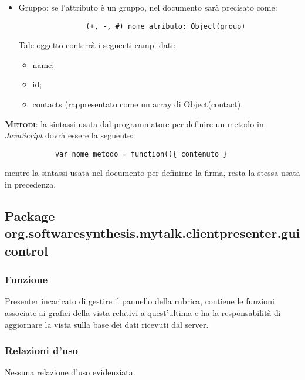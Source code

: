 \begin{description}
\begin{itemize}
\item Gruppo: se l'attributo è un gruppo, nel documento sarà precisato come:
			
			\begin{verbatim}
				(+, -, #) nome_atributo: Object(group)
			\end{verbatim}
			Tale oggetto conterrà i seguenti campi dati:
			\begin{itemize}
			\item name;
			\item id;
			\item contacts (rappresentato come un array di Object(contact).
			\end{itemize}
		\end{itemize}
	\item{\scshape\bfseries Metodi}: la sintassi usata dal programmatore per definire un metodo in \textit{JavaScript} dovrà essere la seguente:
		\begin{verbatim}
			var nome_metodo = function(){ contenuto }
		\end{verbatim}
		
		mentre la sintassi usata nel documento per definirne la firma, resta la stessa usata in precedenza.
	
\end{description}

\subsection{Package org.softwaresynthesis.mytalk.clientpresenter.guicontrol}\label{sec:authentication}


\subsubsection*{Funzione}
Presenter incaricato di gestire il pannello della rubrica, contiene le funzioni associate ai  grafici della vista relativi a quest'ultima e ha la responsabilità di aggiornare la vista sulla base dei dati ricevuti dal server.

\subsubsection*{Relazioni d'uso}
Nessuna relazione d'uso evidenziata.

